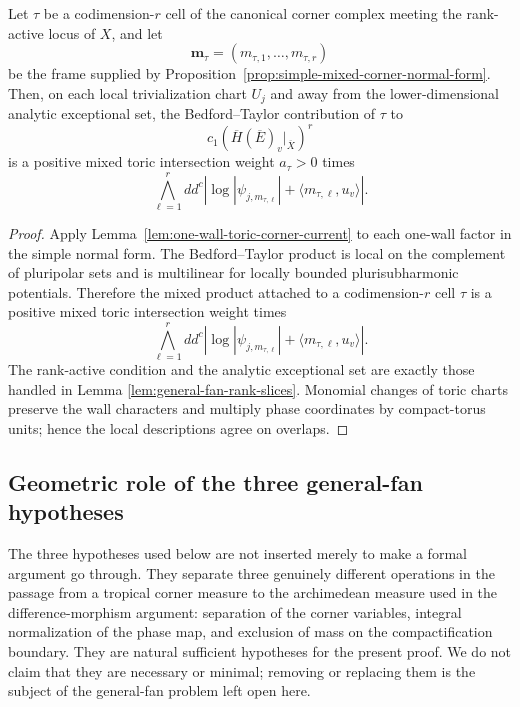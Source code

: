 \documentclass[10pt,a4paper]{amsart}
\theoremstyle{plain}
\theoremstyle{plain}
\numberwithin{equation}{section}
\providecommand{\bE}{\overline{E}}
\begin{document}
\begin{prop}
	\label{prop:simple-mixed-corners-imply-corner-current}
	Let \(\tau\) be a codimension-\(r\) cell of the canonical corner complex
	meeting the rank-active locus of \(X\), and let
	\[
	\mathbf m_\tau=(m_{\tau,1},\ldots,m_{\tau,r})
	\]
	be the frame supplied by
	Proposition~\ref{prop:simple-mixed-corner-normal-form}.  Then, on each local
	trivialization chart \(U_j\) and away from the lower-dimensional analytic
	exceptional set, the Bedford--Taylor contribution of \(\tau\) to
	\[
	c_1(\overline H(\bE)_v|_{\overline X})^r
	\]
	is a positive mixed toric intersection weight \(a_\tau>0\) times
	\[
	\bigwedge_{\ell=1}^r
	dd^c
	\left|
	\log|\psi_{j,m_{\tau,\ell}}|
	+\langle m_{\tau,\ell},u_v\rangle
	\right| .
	\]
\end{prop}

\begin{proof}
	Apply Lemma~\ref{lem:one-wall-toric-corner-current} to each one-wall factor in
	the simple normal form.  The Bedford--Taylor product is local on the complement
	of pluripolar sets and is multilinear for locally bounded plurisubharmonic
	potentials.  Therefore the mixed product attached to a codimension-\(r\) cell
	\(\tau\) is a positive mixed toric intersection weight times
	\[
	\bigwedge_{\ell=1}^r
	dd^c
	\left|
	\log|\psi_{j,m_{\tau,\ell}}|
	+\langle m_{\tau,\ell},u_v\rangle
	\right|.
	\]
	The rank-active condition and the analytic exceptional set are exactly those
	handled in Lemma \ref{lem:general-fan-rank-slices}.  Monomial changes of
	toric charts preserve the wall characters and multiply phase coordinates by
	compact-torus units; hence the local descriptions agree on overlaps.
\end{proof}

\subsection{Geometric role of the three general-fan hypotheses}

The three hypotheses used below are not inserted merely to make a formal
argument go through.  They separate three genuinely different operations in
the passage from a tropical corner measure to the archimedean measure used in
the difference-morphism argument: separation of the corner variables,
integral normalization of the phase map, and exclusion of mass on the
compactification boundary.  They are natural sufficient hypotheses for the
present proof.  We do not claim that they are necessary or minimal; removing
or replacing them is the subject of the general-fan problem left open here.
\end{document}
